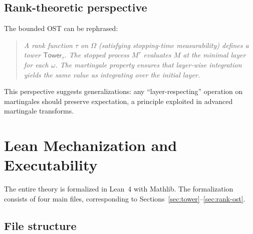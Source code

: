 \documentclass[11pt]{article}
\theoremstyle{definition}
\theoremstyle{remark}
\newcommand{\Tower}{\mathsf{Tower}}
\begin{document}
\subsection{Rank-theoretic perspective}

The bounded OST can be rephrased:
\begin{quote}
\emph{A rank function $\tau$ on $\Omega$ (satisfying stopping-time measurability) defines a tower $\Tower_\tau$.
The stopped process $M^\tau$ evaluates $M$ at the minimal layer for each $\omega$.
The martingale property ensures that layer-wise integration yields the same value as integrating over the initial layer.}
\end{quote}

This perspective suggests generalizations: any ``layer-respecting'' operation on martingales should preserve expectation, a principle exploited in advanced martingale transforms.

\section{Lean Mechanization and Executability}
\label{sec:lean}

The entire theory is formalized in Lean~4 with Mathlib.
The formalization consists of four main files, corresponding to Sections~\ref{sec:tower}--\ref{sec:rank-ost}.

\subsection{File structure}
\end{document}
